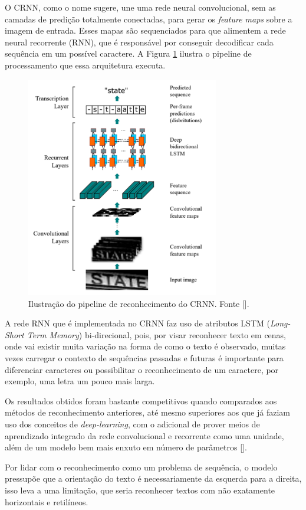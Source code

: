 O CRNN, como o nome sugere, une uma rede neural convolucional, sem as camadas de predição totalmente conectadas, para gerar os \textit{feature maps} sobre a imagem de entrada. Esses mapas são sequenciados para que alimentem a rede neural recorrente (RNN), que é responsável por conseguir decodificar cada sequência em um possível caractere. A Figura \ref{fig:crnn_pipeline} ilustra o pipeline de processamento que essa arquitetura executa.

\begin{figure}
    \centering
    \includegraphics[width=0.75\textwidth]{figs/crnn-pipeline.png}
    \caption{Ilustração do pipeline de reconhecimento do CRNN. Fonte [].}
    \label{fig:crnn_pipeline}
\end{figure}

A rede RNN que é implementada no CRNN faz uso de atributos LSTM (\textit{Long-Short Term Memory}) bi-direcional, pois, por visar reconhecer texto em cenas, onde vai existir muita variação na forma de como o texto é observado, muitas vezes carregar o contexto de sequências passadas e futuras é importante para diferenciar caracteres ou possibilitar o reconhecimento de um caractere, por exemplo, uma letra um pouco mais larga.

Os resultados obtidos foram bastante competitivos quando comparados aos métodos de reconhecimento anteriores, até mesmo superiores aos que já faziam uso dos conceitos de \textit{deep-learning}, com o adicional de prover meios de aprendizado integrado da rede convolucional e recorrente como uma unidade, além de um modelo bem mais enxuto em número de parâmetros [].

Por lidar com o reconhecimento como um problema de sequência, o modelo pressupõe que a orientação do texto é necessariamente da esquerda para a direita, isso leva a uma limitação, que seria reconhecer textos com não exatamente horizontais e retilíneos.

